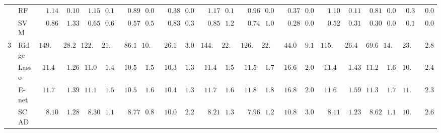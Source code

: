 \begin{tabular}{p{0.2cm}p{1cm}|p{0.6cm}p{0.6cm}|p{0.6cm}p{0.6cm}p{0.6cm}p{0.6cm}p{0.6cm}p{0.6cm}|p{0.6cm}p{0.6cm}p{0.6cm}p{0.6cm}p{0.6cm}p{0.6cm}|p{0.6cm}p{0.6cm}p{0.6cm}p{0.6cm}p{0.6cm}p{0.6cm}}
 & RF  & $\phantom{00}1.14$ & $\phantom{00}0.10$ & $\phantom{00}1.15$ & $\phantom{0}0.11$ & $\phantom{00}0.89$ & $\phantom{0}0.09$ & $\phantom{00}0.38$ & $\phantom{0}0.04$ & $\phantom{00}1.17$ & $\phantom{0}0.11$ & $\phantom{00}0.96$ & $\phantom{0}0.09$ & $\phantom{00}0.37$ & $\phantom{0}0.04$ & $\phantom{00}1.10$ & $\phantom{00}0.11$ & $\phantom{00}0.81$ & $\phantom{0}0.08$ & $\phantom{0}0.35$ & $\phantom{0}0.03$ \\
 & SVM  & $\phantom{00}0.86$ & $\phantom{00}1.33$ & $\phantom{00}0.65$ & $\phantom{0}0.68$ & $\phantom{00}0.57$ & $\phantom{0}0.51$ & $\phantom{00}0.83$ & $\phantom{0}0.34$ & $\phantom{00}0.85$ & $\phantom{0}1.21$ & $\phantom{00}0.74$ & $\phantom{0}1.02$ & $\phantom{00}0.28$ & $\phantom{0}0.08$ & $\phantom{00}0.52$ & $\phantom{00}0.31$ & $\phantom{00}0.30$ & $\phantom{0}0.08$ & $\phantom{0}0.16$ & $\phantom{0}0.03$ \\\hline
3 & Ridge  & $149.45$ & $\phantom{0}28.28$ & $122.74$ & $21.78$ & $\phantom{0}86.14$ & $10.91$ & $\phantom{0}26.16$ & $\phantom{0}3.00$ & $144.11$ & $22.82$ & $126.59$ & $22.42$ & $\phantom{0}44.09$ & $\phantom{0}9.15$ & $115.88$ & $\phantom{0}26.48$ & $\phantom{0}69.61$ & $14.02$ & $23.39$ & $\phantom{0}2.88$ \\
 & Lasso  & $\phantom{0}11.44$ & $\phantom{00}1.26$ & $\phantom{0}11.01$ & $\phantom{0}1.49$ & $\phantom{0}10.50$ & $\phantom{0}1.52$ & $\phantom{0}10.35$ & $\phantom{0}1.37$ & $\phantom{0}11.44$ & $\phantom{0}1.51$ & $\phantom{0}11.58$ & $\phantom{0}1.72$ & $\phantom{0}16.67$ & $\phantom{0}2.00$ & $\phantom{0}11.40$ & $\phantom{00}1.43$ & $\phantom{0}11.26$ & $\phantom{0}1.63$ & $10.90$ & $\phantom{0}2.44$ \\
 & E-net  & $\phantom{0}11.72$ & $\phantom{00}1.39$ & $\phantom{0}11.11$ & $\phantom{0}1.58$ & $\phantom{0}10.55$ & $\phantom{0}1.62$ & $\phantom{0}10.42$ & $\phantom{0}1.36$ & $\phantom{0}11.72$ & $\phantom{0}1.62$ & $\phantom{0}11.84$ & $\phantom{0}1.87$ & $\phantom{0}16.86$ & $\phantom{0}2.05$ & $\phantom{0}11.62$ & $\phantom{00}1.59$ & $\phantom{0}11.34$ & $\phantom{0}1.71$ & $11.05$ & $\phantom{0}2.39$ \\
 & SCAD  & $\phantom{00}8.10$ & $\phantom{00}1.28$ & $\phantom{00}8.30$ & $\phantom{0}1.15$ & $\phantom{00}8.77$ & $\phantom{0}0.89$ & $\phantom{0}10.07$ & $\phantom{0}2.21$ & $\phantom{00}8.21$ & $\phantom{0}1.34$ & $\phantom{00}7.96$ & $\phantom{0}1.28$ & $\phantom{0}10.83$ & $\phantom{0}3.09$ & $\phantom{00}8.11$ & $\phantom{00}1.23$ & $\phantom{00}8.62$ & $\phantom{0}1.13$ & $10.28$ & $\phantom{0}2.67$ \\

\end{tabular}
